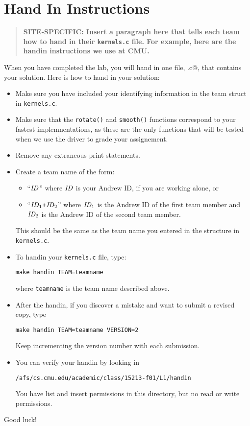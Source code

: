 \documentclass[11pt]{article}
\begin{document}
\section{Hand In Instructions}

\begin{quote}
\bf SITE-SPECIFIC: Insert a paragraph here that tells each team how to
hand in their {\tt kernels.c} file.  For example, here are the handin
instructions we use at CMU.
\end{quote}

When you have completed the lab, you will hand in one file,
\verb@kernels.c@, that contains your solution.  Here is how to hand in
your solution:

\begin{itemize}
\item Make sure you have included your identifying information in 
the team struct in {\tt kernels.c}.  

\item Make sure that the {\tt rotate()} and {\tt smooth()} functions
correspond to your fastest implemnentations, as these are the only
functions that will be tested when we use the driver to grade your assignement.

\item Remove any extraneous print statements.  

\item Create a team name of the form:
\begin{itemize}
\item ``${\it ID}$'' where ${\it ID}$ is your Andrew ID, if you are
working alone, or
\item ``${\it ID}_1${\tt +}${\it ID}_2$'' where ${\it ID}_1$ is the
Andrew ID of the first team member and ${\it ID}_2$ is the Andrew ID
of the second team member.  
\end{itemize}
This should be the same as the team name
you entered in the structure in {\tt kernels.c}.

\item To handin your {\tt kernels.c} file, type:
\small{\begin{verbatim}
make handin TEAM=teamname
\end{verbatim}}
where \verb|teamname| is the team name described above.

\item After the handin, if you discover a mistake and want to
submit a revised copy, type
\small{\begin{verbatim}
make handin TEAM=teamname VERSION=2
\end{verbatim}}
Keep incrementing the version number with each submission.

\item You can verify your handin by looking in 
\small{\begin{verbatim}
/afs/cs.cmu.edu/academic/class/15213-f01/L1/handin
\end{verbatim}}
You have list and insert permissions in this directory, but no
read or write permissions.
\end{itemize}

Good luck!
\end{document}
